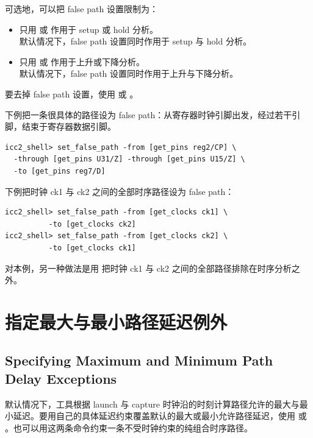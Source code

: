 可选地，可以把 false path 设置限制为：
\begin{itemize}
  \item 只用  或  作用于 setup 或 hold 分析。\\
        默认情况下，false path 设置同时作用于 setup 与 hold 分析。
  \item 只用  或  作用于上升或下降分析。\\
        默认情况下，false path 设置同时作用于上升与下降分析。
\end{itemize}

要去掉 false path 设置，使用   或 。

下例把一条很具体的路径设为 false path：从寄存器时钟引脚出发，经过若干引脚，结束于寄存器数据引脚。
\begin{lstlisting}
icc2_shell> set_false_path -from [get_pins reg2/CP] \
  -through [get_pins U31/Z] -through [get_pins U15/Z] \
  -to [get_pins reg7/D]
\end{lstlisting}

下例把时钟 ck1 与 ck2 之间的全部时序路径设为 false path：
\begin{lstlisting}
icc2_shell> set_false_path -from [get_clocks ck1] \
          -to [get_clocks ck2]
icc2_shell> set_false_path -from [get_clocks ck2] \
          -to [get_clocks ck1]
\end{lstlisting}

对本例，另一种做法是用 \cmd{set\_clock\_groups} 把时钟 ck1 与 ck2 之间的全部路径排除在时序分析之外。

\section{指定最大与最小路径延迟例外}
\subsection*{Specifying Maximum and Minimum Path Delay Exceptions}

默认情况下，工具根据 launch 与 capture 时钟沿的时刻计算路径允许的最大与最小延迟。要用自己的具体延迟约束覆盖默认的最大或最小允许路径延迟，使用  或 。也可以用这两条命令约束一条不受时钟约束的纯组合时序路径。

